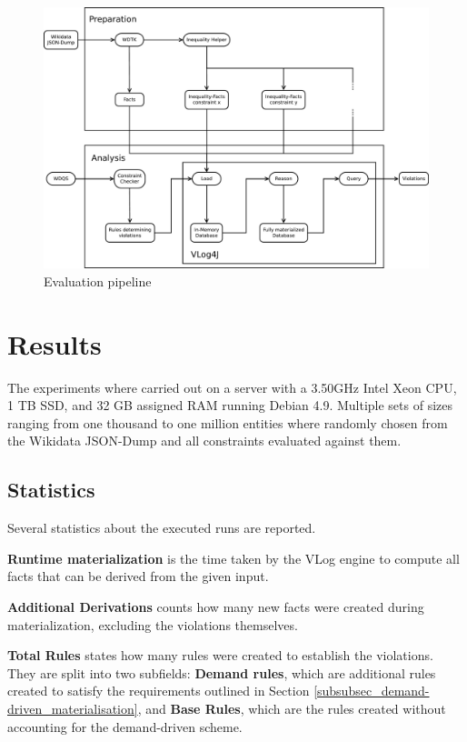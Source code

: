 \documentclass[hyperref,bachelorofscience,fleqn]{cgvpub}
\begin{document}
\begin{figure}
\includegraphics[width=\linewidth]{images/Pipeline.pdf}
\caption{Evaluation pipeline}\label{fig_pipeline}
\end{figure}

\section{Results}\label{sec_results}

The experiments where carried out on a server with a 3.50GHz Intel Xeon CPU, 1 TB SSD, and 32 GB assigned RAM running Debian 4.9. Multiple sets of sizes ranging from one thousand to one million entities where randomly chosen from the Wikidata JSON-Dump and all constraints evaluated against them.

\subsection{Statistics}
Several statistics about the executed runs are reported.

{\bf Runtime materialization} is the time taken by the VLog engine to compute all facts that can be derived from the given input.

{\bf Additional Derivations} counts how many new facts were created during materialization, excluding the violations themselves. 

{\bf Total Rules} states how many rules were created to establish the violations. They are split into two subfields: {\bf Demand rules}, which are additional rules created to satisfy the requirements outlined in Section \ref{subsubsec_demand-driven_materialisation}, and {\bf Base Rules}, which are the rules created without accounting for the demand-driven scheme.
\end{document}
